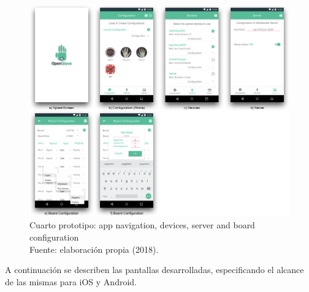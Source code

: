 \begin{figure}[H]
	\centering
	\captionsetup{justification=centering}
   	\includegraphics[width=1.0\textwidth]{images/chapter03/04-prototype/04-prototype.png} 
            \caption[Cuarto prototipo: app navigation, devices, server and board configuration]{Cuarto prototipo: app navigation, devices, server and board configuration \\ Fuente: elaboración propia (2018).}
    \label{fig:prototype-04}
\end{figure}

A continuación se describen las pantallas desarrolladas, especificando el alcance de las mismas para iOS y Android.

